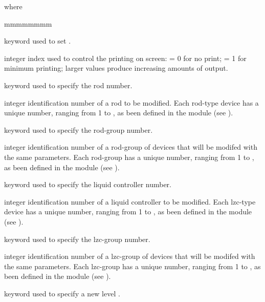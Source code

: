 \noindent where
\begin{ListeDeDescription}{mmmmmmmm}

\item[\moc{EDIT}] keyword used to set .

\item[\dusa{iprint}] integer index used to control the printing on screen:
= 0 for no print; = 1 for minimum printing; larger values produce
increasing amounts of output.

\item[\moc{ROD}] keyword used to specify the rod  number.

\item[\dusa{irod}] integer identification number of a rod to be modified.
Each rod-type device has a unique  number, ranging from 1 to
, as been defined in the  module (see ).

\item[\moc{ROD-GROUP}] keyword used to specify the rod-group
 number.

\item[\dusa{irgrp}] integer identification number of a rod-group of devices
that will be modifed with the same parameters. Each rod-group has a unique
 number, ranging from 1 to , as been defined in the
 module (see ).

\item[\moc{LZC}] keyword used to specify the liquid controller
 number.

\item[\dusa{ilzc}] integer identification number of a liquid controller to be modified.
Each lzc-type device has a unique  number, ranging from 1 to
, as been defined in the  module (see ).

\item[\moc{LZC-GROUP}] keyword used to specify the lzc-group
 number.

\item[\dusa{ilgrp}] integer identification number of a lzc-group of devices
that will be modifed with the same parameters. Each lzc-group has a unique
 number, ranging from 1 to , as been defined in the
 module (see ).

\item[\moc{LEVEL}] keyword used to specify a new level .


\end{ListeDeDescription}
